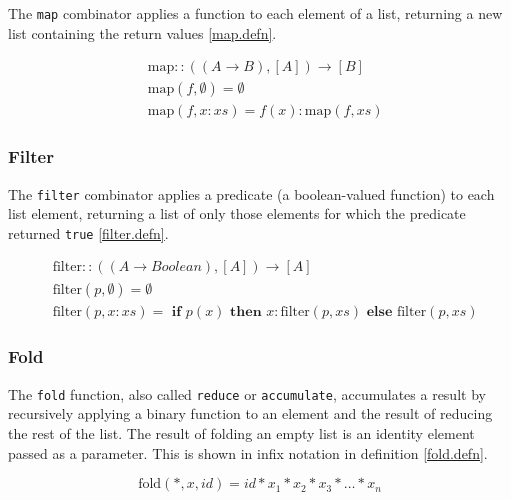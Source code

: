 The \texttt{map} combinator applies a function to each element of a list, returning a new list containing the return values \eqref{map.defn}.

\begin{equation}
\label{map.defn}
\begin{split}
& \text{map} :: ((A \to B), [A]) \to [B] \\
& \text{map}(f, \emptyset) = \emptyset \\
& \text{map}(f, x:xs) = f(x):\text{map}(f, xs)
\end{split}
\end{equation}

\subsubsection{Filter}

The \texttt{filter} combinator applies a predicate (a boolean-valued function) to each list element, returning a list of only those elements for which the predicate returned \texttt{true} \eqref{filter.defn}.

\begin{equation}
\label{filter.defn}
\begin{split}
& \text{filter} :: ((A \to Boolean), [A]) \to [A] \\
& \text{filter}(p, \emptyset) = \emptyset \\
& \text{filter}(p, x:xs) = \textbf{ if } p(x) \textbf{ then } x:\text{filter}(p, xs) \textbf{ else } \text{filter}(p, xs)
\end{split}
\end{equation}

\subsubsection{Fold}

The \texttt{fold} function, also called \texttt{reduce} or \texttt{accumulate}, accumulates a result by recursively applying a binary function to an element and the result of reducing the rest of the list. The result of folding an empty list is an identity element passed as a parameter. This is shown in infix notation in definition \ref{fold.defn}.

\begin{equation}
\text{fold}(\ast, x, id) = id \ast x_1\ast x_2 \ast x_3 \ast \dots \ast x_n \label{fold.defn}
\end{equation}

